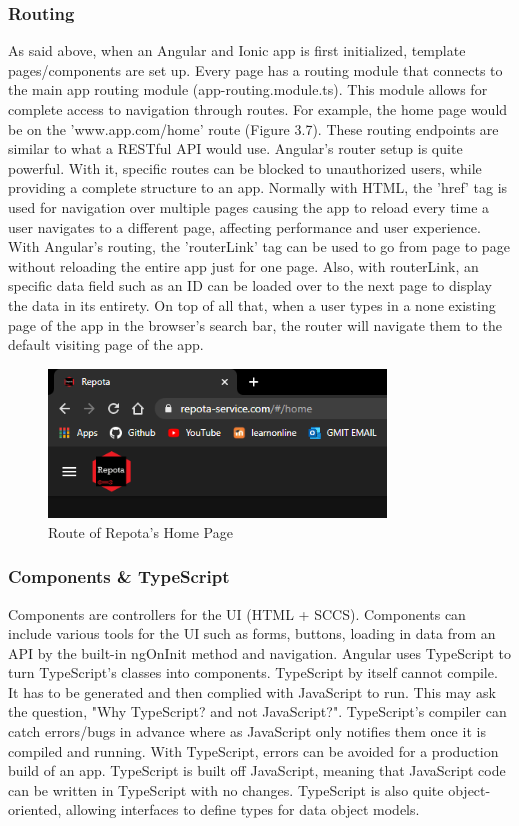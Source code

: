\subsubsection{Routing}
As said above, when an Angular and Ionic app is first initialized, template pages/components are set up. Every page has a routing module that connects to the main app routing module (app-routing.module.ts). This module allows for complete access to navigation through routes. For example, the home page would be on the 'www.app.com/home' route (Figure 3.7). These routing endpoints are similar to what a RESTful API would use. Angular's router setup is quite powerful. With it, specific routes can be blocked to unauthorized users, while providing a complete structure to an app. Normally with HTML, the 'href' tag is used for navigation over multiple pages causing the app to reload every time a user navigates to a different page, affecting performance and user experience. With Angular's routing, the 'routerLink' tag can be used to go from page to page without reloading the entire app just for one page. Also, with routerLink, an specific data field such as an ID can be loaded over to the next page to display the data in its entirety. On top of all that, when a user types in a none existing page of the app in the browser's search bar, the router will navigate them to the default visiting page of the app. \cite{ref15}

\begin{figure}[H]
    \caption{Route of Repota's Home Page}
    \label{image:homeRoute}
    \centering
    \includegraphics[width=0.8\textwidth]{images/misc/home-route.png}
\end{figure}

\subsubsection{Components \& TypeScript}
Components are controllers for the UI (HTML + SCCS). Components can include various tools for the UI such as forms, buttons, loading in data from an API by the built-in ngOnInit method and navigation. Angular uses TypeScript to turn TypeScript's classes into components. TypeScript by itself cannot compile. It has to be generated and then complied with JavaScript to run. This may ask the question, "Why TypeScript? and not JavaScript?". TypeScript's compiler can catch errors/bugs in advance where as JavaScript only notifies them once it is compiled and running. With TypeScript, errors can be avoided for a production build of an app. TypeScript is built off JavaScript, meaning that JavaScript code can be written in TypeScript with no changes. TypeScript is also quite object-oriented, allowing interfaces to define types for data object models. \cite{ref16}

